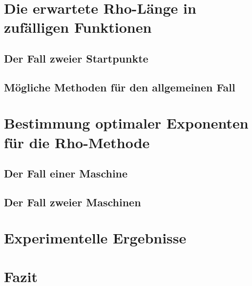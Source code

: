\documentclass[a4paper, 10pt, ngerman]{article}
\begin{document}
\section{Die erwartete Rho-Länge in zufälligen Funktionen}

\subsection{Der Fall zweier Startpunkte}

\subsection{Mögliche Methoden für den allgemeinen Fall}

\section{Bestimmung optimaler Exponenten für die Rho-Methode}

\subsection{Der Fall einer Maschine}

\subsection{Der Fall zweier Maschinen}

\section{Experimentelle Ergebnisse}

\section{Fazit}

\printbibliography
\end{document}
